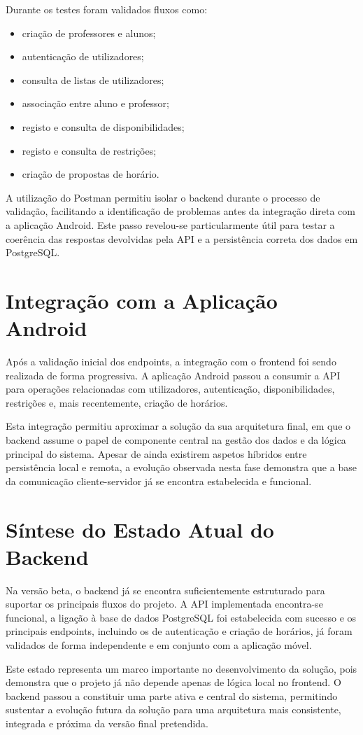 Durante os testes foram validados fluxos como:
\begin{itemize}
    \item criação de professores e alunos;
    \item autenticação de utilizadores;
    \item consulta de listas de utilizadores;
    \item associação entre aluno e professor;
    \item registo e consulta de disponibilidades;
    \item registo e consulta de restrições;
    \item criação de propostas de horário.
\end{itemize}

A utilização do Postman permitiu isolar o backend durante o processo de validação, facilitando a identificação de problemas antes da integração direta com a aplicação Android.
Este passo revelou-se particularmente útil para testar a coerência das respostas devolvidas pela API e a persistência correta dos dados em PostgreSQL.

\section{Integração com a Aplicação Android}

Após a validação inicial dos endpoints, a integração com o frontend foi sendo realizada de forma progressiva.
A aplicação Android passou a consumir a API para operações relacionadas com utilizadores, autenticação, disponibilidades, restrições e, mais recentemente, criação de horários.

Esta integração permitiu aproximar a solução da sua arquitetura final, em que o backend assume o papel de componente central na gestão dos dados e da lógica principal do sistema.
Apesar de ainda existirem aspetos híbridos entre persistência local e remota, a evolução observada nesta fase demonstra que a base da comunicação cliente-servidor já se encontra estabelecida e funcional.

\section{Síntese do Estado Atual do Backend}

Na versão beta, o backend já se encontra suficientemente estruturado para suportar os principais fluxos do projeto.
A API implementada encontra-se funcional, a ligação à base de dados PostgreSQL foi estabelecida com sucesso e os principais
endpoints, incluindo os de autenticação e criação de horários, já foram validados de forma independente e em conjunto com a aplicação móvel.

Este estado representa um marco importante no desenvolvimento da solução, pois demonstra que o projeto já não depende apenas de lógica local no frontend.
O backend passou a constituir uma parte ativa e central do sistema, permitindo sustentar a evolução futura da solução para uma arquitetura mais consistente,
integrada e próxima da versão final pretendida.
